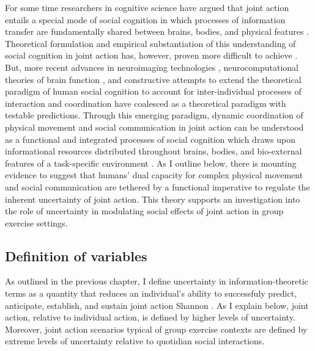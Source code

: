 \begin{CJK}{UTF8}{gbsn}
For some time researchers in cognitive science have argued that joint action entails a special mode of social cognition in which processes of information transfer are fundamentally shared between brains, bodies, and physical features \citep{Hutchins1995,Kirsh2006,Susi2001}.  Theoretical formulation and empirical substantiation of this understanding of social cognition in joint action has, however, proven more difficult to achieve \citep[due in part to the tendency of the MES and CR to preference the functional role of symbolic and amodal cognitive processes; see][]{Semin2008,Yufik2013}.
But, more recent advances in neuroimaging technologies \citep{Frith2007}, neurocomputational theories of brain function \citep{Friston2010,Frith2010,Yufik2013,Clark2013}, and constructive attempts to extend the theoretical paradigm of human social cognition to account for inter-individual processes of interaction and coordination \citep[e.g.][]{Sebanz2006,Semin2008,Dale2014} have coalesced as a theoretical paradigm with testable predictions.  Through this emerging paradigm, dynamic coordination of physical movement and social communication in joint action can be understood as a functional and integrated processes of social cognition which draws upon informational resources distributed throughout brains, bodies, and bio-external features of a task-specific environment \citep{Clark2015}.   As I outline below, there is mounting evidence to suggest that humans' dual capacity for complex physical movement and social communication are tethered by a functional imperative to regulate the inherent uncertainty of joint action.  This theory supports an investigation into the role of uncertainty in modulating social effects of joint action in group exercise settings.







\subsection{Definition of variables}


As outlined in the previous chapter, I define uncertainty in information-theoretic terms as a quantity that reduces an individual's ability to successfuly predict, anticipate, establish, and sustain  joint action  Shannon \citep{Shannon1963}.  As I explain below, joint action, relative to individual action, is defined by higher levels of uncertainty.  Moreover, joint action scenarios typical of group exercise contexts are defined by extreme levels of uncertainty relative to quotidian social interactions.




\end{CJK}
